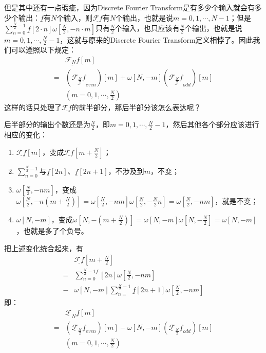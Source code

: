 但是其中还有一点瑕疵，因为Discrete Fourier Transform是有多少个输入就会有多少个输出：$\underline{f}$有$N$个输入，则$\underline{\mathcal{F}f}$有$N$个输出，也就是说$m =0,1,\cdots,N-1$；但是$\sum\limits_{n=0}^{\frac{N}{2}-1}\underline{f}[2\cdot n]\omega[\frac{N}{2},-n\cdot m]$只有$\frac{N}{2}$个输入，也只应该有$\frac{N}{2}$个输出，也就是说$m= 0,1,\cdots,\frac{N}{2}-1$，这就与原来的Discrete Fourier Transform定义相悖了。因此我们可以遵照以下规定：
\begin{align*}
	  & \underline{\mathcal{F}_N f}[m]                                                                                                             \\
	= & \left( \underline{\mathcal{F}_{\frac{N}{2}}f}_{even} \right)[m]+\omega[N,-m]\left( \underline{\mathcal{F}_{\frac{N}{2}}f}_{odd} \right)[m] \\
	  & (m=0,1, \cdots,\frac{N}{2})
\end{align*}
这样的话只处理了$\underline{\mathcal{F}f}$的前半部分，那后半部分该怎么表达呢？

后半部分的输出个数还是为$\frac{N}{2}$，即$m=0,1,\cdots,\frac{N}{2}-1$，然后其他各个部分应该进行相应的变化：
\begin{enumerate}
	\item $\underline{\mathcal{F}f}[m]$，变成$\underline{\mathcal{F}f}[m+\frac{N}{2}]$；
	\item $\sum_{n=0}^{\frac{N}{2}-1}$与$\underline{f}[2n]$、$\underline{f}[2n+1]$，不涉及到$m$，不变；
	\item $\omega[\frac{N}{2},-nm]$，变成$\omega[\frac{N}{2},-n(m+\frac{N}{2})] = \omega[\frac{N}{2},-nm]\omega[\frac{N}{2},-\frac{N}{2}n] = \omega[\frac{N}{2},-nm]$，就是不变；
	\item $\omega[N,-m]$，变成$\omega[N,-(m+\frac{N}{2})] = \omega[N,-m]\omega[N,-\frac{N}{2}] = \omega[N,-m]$，也就是多了个负号。
\end{enumerate}

把上述变化统合起来，有
\begin{align*}
	  & \underline{\mathcal{F}f}[m+\frac{N}{2}]                                         \\
	= & \sum_{n=0}^{\frac{N}{2}-1f}[2n]\omega[\frac{N}{2},-nm]                          \\
	- & \omega[N,-m]\sum_{n=}^{\frac{N}{2}-1}\underline{f}[2n+1]\omega[\frac{N}{2},-nm]
\end{align*}
即：
\begin{align*}
	  & \underline{\mathcal{F}}_N\underline{f}[m]                                                                                                                          \\
	= & \left( \underline{\mathcal{F}}_{\frac{N}{2}}\underline{f}_{even} \right)[m]-\omega[N,-m]\left( \underline{\mathcal{F}}_{\frac{N}{2}}\underline{f}_{odd} \right)[m] \\
	  & (m=0,1, \cdots,\frac{N}{2})
\end{align*}
